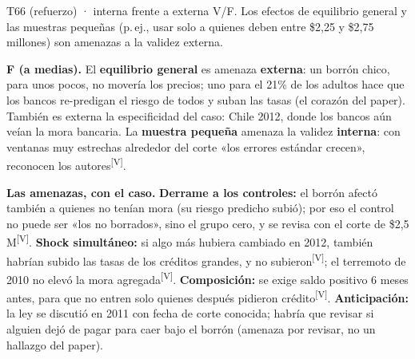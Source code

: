 \documentclass[10pt,a4paper]{article}
\newcommand{\V}{\textsuperscript{\textcolor{green!45!black}{[V]}}}
\begin{document}
\begin{enun}{T66 (refuerzo) · interna frente a externa}
V/F. Los efectos de equilibrio general y las muestras pequeñas (p.\,ej., usar solo a quienes deben entre \$2,25 y \$2,75 millones) son amenazas a la validez externa.
\end{enun}
\begin{ejemplar}
\textbf{F (a medias).} El \textbf{equilibrio general} es amenaza \textbf{externa}: un borrón chico, para unos pocos, no movería los precios; uno para el 21\% de los adultos hace que los bancos re-predigan el riesgo de todos y suban las tasas (el corazón del paper). También es externa la especificidad del caso: Chile 2012, donde los bancos aún veían la mora bancaria. La \textbf{muestra pequeña} amenaza la validez \textbf{interna}: con ventanas muy estrechas alrededor del corte «los errores estándar crecen», reconocen los autores\V.
\end{ejemplar}

\textbf{Las amenazas, con el caso.} \textbf{Derrame a los controles:} el borrón afectó también a quienes no tenían mora (su riesgo predicho subió); por eso el control no puede ser «los no borrados», sino el grupo cero, y se revisa con el corte de \$2,5 M\V. \textbf{Shock simultáneo:} si algo más hubiera cambiado en 2012, también habrían subido las tasas de los créditos grandes, y no subieron\V; el terremoto de 2010 no elevó la mora agregada\V. \textbf{Composición:} se exige saldo positivo 6 meses antes, para que no entren solo quienes después pidieron crédito\V. \textbf{Anticipación:} la ley se discutió en 2011 con fecha de corte conocida; habría que revisar si alguien dejó de pagar para caer bajo el borrón (amenaza por revisar, no un hallazgo del paper).
\end{document}
